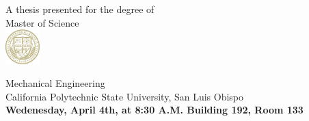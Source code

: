 \documentclass[20pt]{article}
\begin{document}
\begin{center}
			A thesis presented for the degree of\\
			Master of Science\\[2pt]
			
			
			\includegraphics[width=0.1\textwidth]{./figures/cal-poly-university-seal.jpg}
			
			Mechanical Engineering\\
			California Polytechnic State University, San Luis Obispo\\[6pt]
			\textbf{Wedenesday, April 4th, at 8:30 A.M. Building 192, Room 133}
			



	\end{center}
\end{document}
